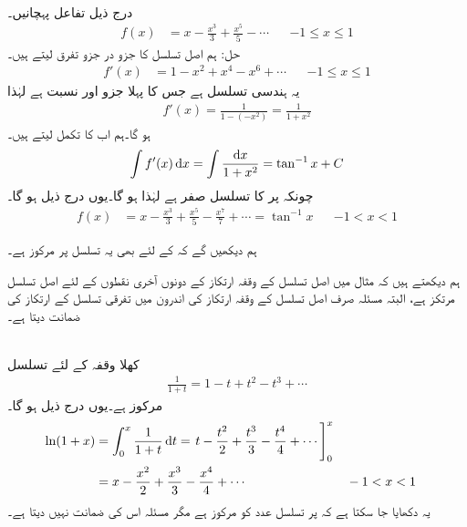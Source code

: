\\
درج ذیل تفاعل پہچانیں۔
\begin{align*}
f(x)&=x-\frac{x^3}{3}+\frac{x^5}{5}-\cdots&&-1\le x\le 1
\end{align*}
حل:\quad
ہم اصل تسلسل کا جزو در جزو تفرق لیتے ہیں۔
\begin{align*}
f'(x)&=1-x^2+x^4-x^6+\cdots&&-1\le x\le 1
\end{align*}
یہ ہندسی تسلسل ہے جس کا پہلا جزو  اور نسبت  ہے لہٰذا
\begin{align*}
f'(x)=\frac{1}{1-(-x^2)}=\frac{1}{1+x^2}
\end{align*}
ہو گا۔ہم اب  کا تکمل لیتے ہیں۔
\begin{align*}
\int f'(x)\dif x=\int\frac{\dif x}{1+x^2}=\tan^{-1}x+C
\end{align*}
چونکہ  پر  کا تسلسل صفر ہے لہٰذا  ہو گا۔یوں درج ذیل ہو گا۔
\begin{align}
f(x)&=x-\frac{x^3}{3}+\frac{x^5}{5}-\frac{x^7}{7}+\cdots=\tan^{-1}x&&-1<x<1
\end{align}

ہم دیکھیں گے کہ  کے لئے بھی یہ تسلسل  پر مرکوز ہے۔

ہم دیکھتے ہیں کہ مثال  میں اصل تسلسل کے وقفہ ارتکاز کے   دونوں آخری نقطوں کے لئے اصل تسلسل مرتکز ہے، البتہ مسئلہ  صرف اصل تسلسل کے وقفہ ارتکاز کی اندرون میں تفرقی تسلسل کے ارتکاز کی ضمانت دیتا ہے۔

\\
کھلا وقفہ  کے لئے تسلسل
\begin{align*}
\frac{1}{1+t}=1-t+t^2-t^3+\cdots
\end{align*}
 مرکوز ہے۔یوں درج ذیل ہو گا۔
\begin{align*}
\ln(1+x)&=\int_0^x\frac{1}{1+t}\dif t=\left. t-\frac{t^2}{2}+\frac{t^3}{3}-\frac{t^4}{4}+\cdots\right]_0^x\\
&=x-\frac{x^2}{2}+\frac{x^3}{3}-\frac{x^4}{4}+\cdots&&-1<x<1
\end{align*}
یہ دکھایا جا سکتا ہے کہ  پر تسلسل عدد  کو مرکوز ہے  مگر مسئلہ اس کی ضمانت نہیں دیتا ہے۔


